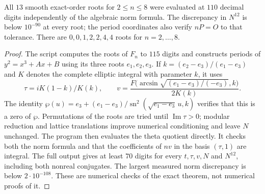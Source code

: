 \begin{statement}
All $13$ smooth exact-order roots for $2\le n\le8$ were evaluated
at $110$ decimal digits independently of the algebraic norm formula.
The discrepancy in $N^{12}$ is below $10^{-90}$ at every root;
the period coordinates also verify $nP=O$ to that tolerance.
There are $0,0,1,2,2,4,4$ roots for $n=2,\ldots,8$.
\end{statement}
\begin{proof}
The script  computes the
roots of $F_n$ to $115$ digits and constructs periods of
$y^2=x^3+Ax+B$ using its three roots $e_1,e_2,e_3$. If
$k=(e_2-e_3)/(e_1-e_3)$ and $K$ denotes the complete elliptic
integral with parameter $k$, it uses
\[
 \tau=iK(1-k)/K(k),\qquad
 v=\frac{F\bigl(\arcsin\sqrt{(e_1-e_3)/(-e_3)},k\bigr)}{2K(k)}.
\]
The identity
$\wp(u)=e_3+(e_1-e_3)/\operatorname{sn}^2
(\sqrt{e_1-e_3}\,u,k)$ verifies that this is a zero of $\wp$.
Permutations of the roots are tried until $\operatorname{Im}\tau>0$;
modular reduction and lattice translations improve numerical
conditioning and leave $N$ unchanged. The program then evaluates
the theta quotient directly. It checks both the norm formula and
that the coefficients of $nv$ in the basis $(\tau,1)$ are integral.
The full output gives at least $70$ digits for every $t,\tau,v,N$
and $N^{12}$, including both nonreal conjugates. The largest measured
norm discrepancy is below $2\cdot10^{-108}$. These are numerical
checks of the exact theorem, not numerical proofs of it.
\end{proof}

